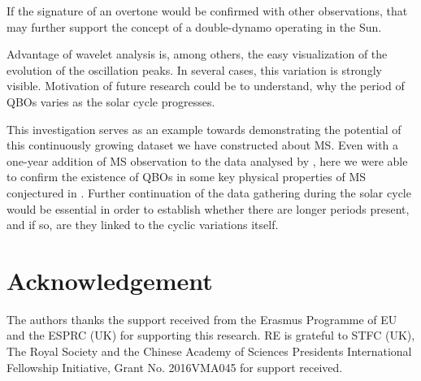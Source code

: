 \documentclass[final,authoryear,5p]{elsarticle}
\begin{document}
If the signature of an overtone would be confirmed with other observations, that may further support the concept of a double-dynamo operating in the Sun.

Advantage of wavelet analysis is, among others, the easy visualization of the evolution of the oscillation peaks. In several cases, this variation is strongly visible. Motivation of future research could be to understand, why the period of QBOs varies as the solar cycle progresses.

This investigation serves as an example towards demonstrating the potential of this continuously growing dataset we have constructed about MS. Even with a one-year addition of MS observation to the data analysed by \cite{kiss2017}, here we were able to confirm the existence of QBOs in some key physical properties of MS conjectured in \cite{kiss2017}. Further continuation of the data gathering during the solar cycle would be essential in order to establish whether there are longer periods  present, and if so, are they linked to the cyclic variations itself.

\section{Acknowledgement}
The authors thanks the support received from the Erasmus Programme of EU and the ESPRC (UK) for supporting this research.  RE is grateful to STFC (UK), The Royal Society and the Chinese Academy of Sciences Presidents International Fellowship Initiative, Grant No. 2016VMA045 for support received.
\end{document}
